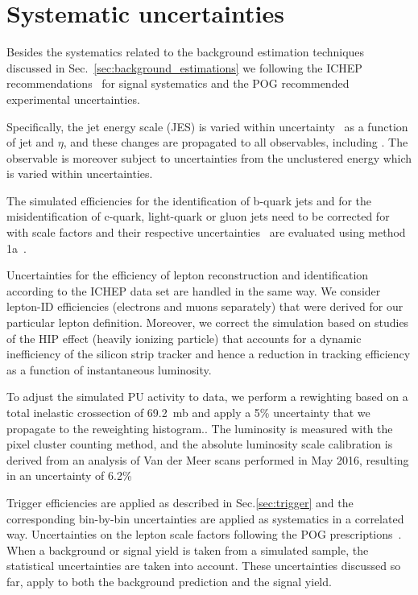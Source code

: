 \section{Systematic uncertainties}
\label{sec:systematics}

Besides the systematics related to the background estimation techniques discussed in Sec.~\ref{sec:background_estimations} we following the ICHEP recommendations~\cite{twiki:sys} for signal systematics and the POG recommended experimental uncertainties.


Specifically, the jet energy scale (JES) is varied within uncertainty~\cite{Chatrchyan:2011ds} as a function of jet \pt and $\eta$, and
these changes are propagated to all observables, including \ETmiss. The \ETmiss observable is moreover subject to uncertainties from the 
unclustered energy which is varied within uncertainties.

The simulated efficiencies for the identification of b-quark jets and for the misidentification of c-quark,
light-quark or gluon jets need to be corrected for with scale factors and their respective uncertainties~\cite{CMS-PAS-BTV-15-001} are evaluated using method 1a~\cite{twiki:btagSF}.

Uncertainties for the efficiency of lepton reconstruction and identification according to the ICHEP data set are handled in the same way. We consider
lepton-ID efficiencies (electrons and muons separately) that were derived for our particular lepton definition. Moreover, we correct the simulation based
on studies of the HIP effect (heavily ionizing particle) that accounts for a dynamic inefficiency of the silicon strip tracker and hence a reduction in tracking efficiency
as a function of instantaneous luminosity. 

To adjust the simulated PU activity to data, we perform a rewighting based on a total inelastic crossection of 69.2~mb and apply a 5\% uncertainty that we propagate to the reweighting histogram..
The luminosity is measured with the pixel cluster counting method, and the absolute luminosity scale calibration is derived from
an analysis of Van der Meer scans performed in May 2016, resulting in an uncertainty of 6.2\%~\cite{LUMI2016}

Trigger efficiencies are applied as described in Sec.\ref{sec:trigger} and the corresponding bin-by-bin uncertainties are applied as systematics in a correlated way.
Uncertainties on the lepton scale factors following the POG prescriptions~\citep{twiki:eSFsys}.
When a background or signal yield is taken from a simulated sample, the statistical uncertainties are taken into account.
These uncertainties discussed so far, apply to both the background prediction and the signal yield.


